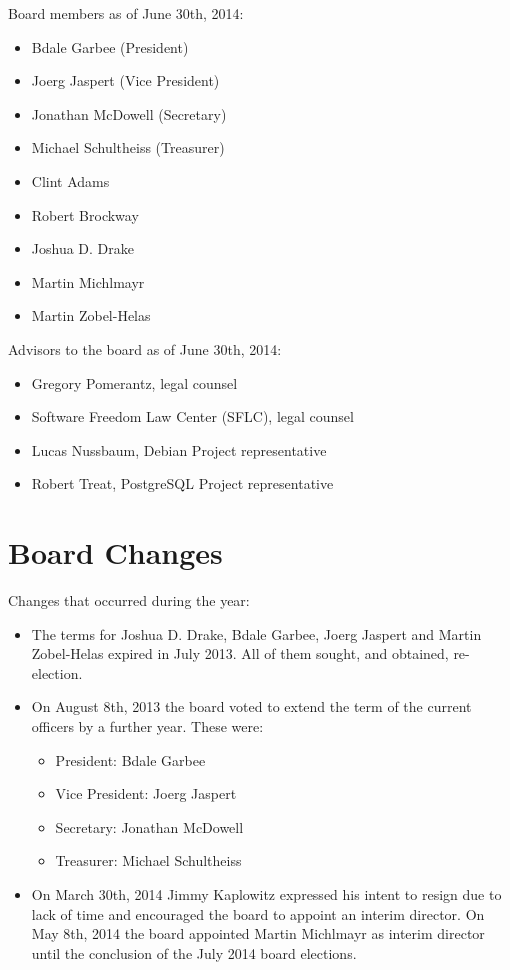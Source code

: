 \documentclass[letterpaper]{report}
\begin{document}
Board members as of June 30th, 2014:

\begin{itemize}
\item Bdale Garbee (President)
\item Joerg Jaspert (Vice President)
\item Jonathan McDowell (Secretary)
\item Michael Schultheiss (Treasurer)
\item Clint Adams
\item Robert Brockway
\item Joshua D. Drake
\item Martin Michlmayr
\item Martin Zobel-Helas
\end{itemize}

Advisors to the board as of June 30th, 2014:

\begin{itemize}
\item Gregory Pomerantz, legal counsel
\item Software Freedom Law Center (SFLC), legal counsel
\item Lucas Nussbaum, Debian Project representative
\item Robert Treat, PostgreSQL Project representative
\end{itemize}

\section{Board Changes}

Changes that occurred during the year:

\begin{itemize}
\item The terms for Joshua D. Drake, Bdale Garbee, Joerg Jaspert and
Martin Zobel-Helas expired in July 2013. All of them sought, and
obtained, re-election.
\item On August 8th, 2013 the board voted to extend the term of the current
officers by a further year. These were:
\begin{itemize}
\item President: Bdale Garbee
\item Vice President: Joerg Jaspert
\item Secretary: Jonathan McDowell
\item Treasurer: Michael Schultheiss
\end{itemize}
\item On March 30th, 2014 Jimmy Kaplowitz expressed his intent to resign
due to lack of time and encouraged the board to appoint an interim
director.  On May 8th, 2014 the board appointed Martin Michlmayr as
interim director until the conclusion of the July 2014 board elections.
\end{itemize}
\end{document}
